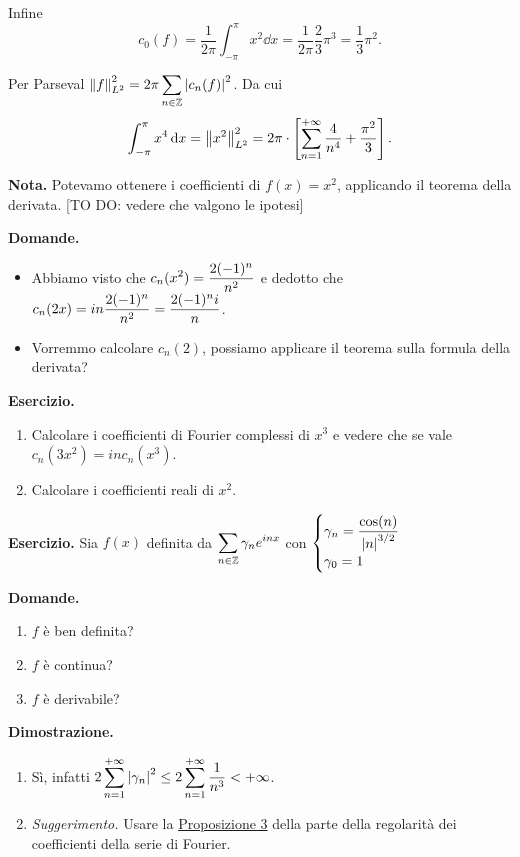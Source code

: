 Infine
%
$$
c_0(f) = \frac{1}{2\pi} \int_{-\pi}^\pi x^2 \dd x = \frac{1}{2\pi} \frac{2}{3} \pi^3 = \frac{1}{3} \pi^2.
$$
%

Per Parseval $\displaystyle \left\lVert f \right\rVert_{L^2}^2 = 2\pi \sum_{n \in \mathbb Z} \left| c_n(f) \right|^2$.
Da cui
%
$$
\int_{-\pi}^\pi x^4 \,\mathrm{d} x = \left\lVert x^2 \right\rVert_{L^2}^2 = 2\pi \cdot \left[ \sum_{n=1}^{+\infty} \frac{4}{n^4} + \frac{\pi^2}{3}  \right].
$$
%

\textbf{Nota.} Potevamo ottenere i coefficienti di $f(x) = x^2$, applicando il teorema della derivata. [TO DO: vedere che valgono le ipotesi]

\textbf{Domande.}
\begin{itemize}

	\item Abbiamo visto che $\displaystyle c_n(x^2) = \frac{2 (-1)^n}{n^2}$ e dedotto che $\displaystyle c_n(2x) = in \frac{2(-1)^n}{n^2} = \frac{2(-1)^n i}{n}$.


	\item Vorremmo calcolare $c_n(2)$, possiamo applicare il teorema sulla formula della derivata?

\end{itemize}

\textbf{Esercizio.}
\begin{enumerate}

	\item Calcolare i coefficienti di Fourier complessi di $x^3$ e vedere che se vale $c_n(3x^2) = i n c_n(x^3)$.


	\item Calcolare i coefficienti reali di $x^2$.

\end{enumerate}

\textbf{Esercizio.} Sia $f(x)$ definita da $\displaystyle \sum_{n \in \mathbb Z} \gamma_n e^{inx} $ con $\ds  %
\begin{cases}
	\ds \gamma_n = \frac{\cos(n)}{\left| n \right|^{3 / 2}} \\
	\gamma_0 = 1
\end{cases}
$

\textbf{Domande.}
\begin{enumerate}
\item $f$ è ben definita?

\item $f$ è continua?

\item $f$ è derivabile?
\end{enumerate}

\textbf{Dimostrazione.}
\begin{enumerate}

	\item Sì, infatti $\displaystyle 2 \sum_{n=1}^{+\infty} \left| \gamma_n \right|^2 \leq 2 \sum_{n=1}^{+\infty} \frac{1}{n^3} < +\infty $.


	\item \textit{Suggerimento.} Usare la \hyperlink{prop:2021-08nov_prop_3}{Proposizione 3} della parte della regolarità dei coefficienti della serie di Fourier.

\end{enumerate}
